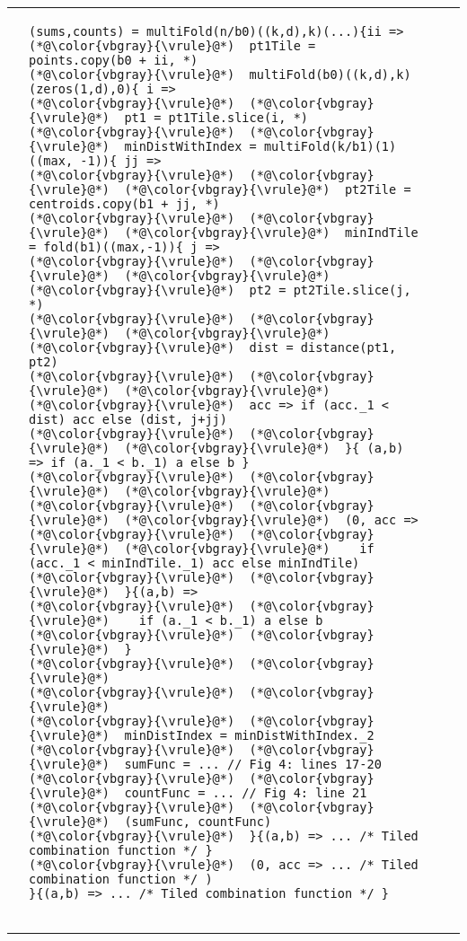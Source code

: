 \hspace{-0.105\textwidth}
\centering\begin{tabular}{cm{}m{}m{}}
{} &
{\begin{lstlisting}
(sums,counts) = multiFold(n/b0)((k,d),k)(...){ii =>
(*@\color{vbgray}{\vrule}@*)  pt1Tile = points.copy(b0 + ii, *)
(*@\color{vbgray}{\vrule}@*)  multiFold(b0)((k,d),k)(zeros(1,d),0){ i =>
(*@\color{vbgray}{\vrule}@*)  (*@\color{vbgray}{\vrule}@*)  pt1 = pt1Tile.slice(i, *)
(*@\color{vbgray}{\vrule}@*)  (*@\color{vbgray}{\vrule}@*)  minDistWithIndex = multiFold(k/b1)(1)((max, -1)){ jj =>
(*@\color{vbgray}{\vrule}@*)  (*@\color{vbgray}{\vrule}@*)  (*@\color{vbgray}{\vrule}@*)  pt2Tile = centroids.copy(b1 + jj, *)
(*@\color{vbgray}{\vrule}@*)  (*@\color{vbgray}{\vrule}@*)  (*@\color{vbgray}{\vrule}@*)  minIndTile = fold(b1)((max,-1)){ j =>
(*@\color{vbgray}{\vrule}@*)  (*@\color{vbgray}{\vrule}@*)  (*@\color{vbgray}{\vrule}@*)  (*@\color{vbgray}{\vrule}@*)  pt2 = pt2Tile.slice(j, *)
(*@\color{vbgray}{\vrule}@*)  (*@\color{vbgray}{\vrule}@*)  (*@\color{vbgray}{\vrule}@*)  (*@\color{vbgray}{\vrule}@*)  dist = distance(pt1, pt2)
(*@\color{vbgray}{\vrule}@*)  (*@\color{vbgray}{\vrule}@*)  (*@\color{vbgray}{\vrule}@*)  (*@\color{vbgray}{\vrule}@*)  acc => if (acc._1 < dist) acc else (dist, j+jj)
(*@\color{vbgray}{\vrule}@*)  (*@\color{vbgray}{\vrule}@*)  (*@\color{vbgray}{\vrule}@*)  }{ (a,b) => if (a._1 < b._1) a else b }
(*@\color{vbgray}{\vrule}@*)  (*@\color{vbgray}{\vrule}@*)  (*@\color{vbgray}{\vrule}@*)
(*@\color{vbgray}{\vrule}@*)  (*@\color{vbgray}{\vrule}@*)  (*@\color{vbgray}{\vrule}@*)  (0, acc =>
(*@\color{vbgray}{\vrule}@*)  (*@\color{vbgray}{\vrule}@*)  (*@\color{vbgray}{\vrule}@*)    if (acc._1 < minIndTile._1) acc else minIndTile)
(*@\color{vbgray}{\vrule}@*)  (*@\color{vbgray}{\vrule}@*)  }{(a,b) =>
(*@\color{vbgray}{\vrule}@*)  (*@\color{vbgray}{\vrule}@*)    if (a._1 < b._1) a else b
(*@\color{vbgray}{\vrule}@*)  (*@\color{vbgray}{\vrule}@*)  }
(*@\color{vbgray}{\vrule}@*)  (*@\color{vbgray}{\vrule}@*)
(*@\color{vbgray}{\vrule}@*)  (*@\color{vbgray}{\vrule}@*)
(*@\color{vbgray}{\vrule}@*)  (*@\color{vbgray}{\vrule}@*)  minDistIndex = minDistWithIndex._2
(*@\color{vbgray}{\vrule}@*)  (*@\color{vbgray}{\vrule}@*)  sumFunc = ... // Fig 4: lines 17-20
(*@\color{vbgray}{\vrule}@*)  (*@\color{vbgray}{\vrule}@*)  countFunc = ... // Fig 4: line 21
(*@\color{vbgray}{\vrule}@*)  (*@\color{vbgray}{\vrule}@*)  (sumFunc, countFunc)
(*@\color{vbgray}{\vrule}@*)  }{(a,b) => ... /* Tiled combination function */ }
(*@\color{vbgray}{\vrule}@*)  (0, acc => ... /* Tiled combination function */ )
}{(a,b) => ... /* Tiled combination function */ }


\end{lstlisting}}
\end{tabular}
